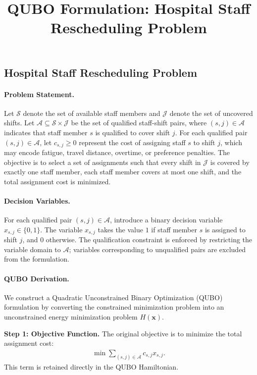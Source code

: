 \documentclass[12pt]{article}
\title{QUBO Formulation: Hospital Staff Rescheduling Problem}
\date{}
\begin{document}
\maketitle

\subsection*{Hospital Staff Rescheduling Problem}

\paragraph{Problem Statement.}
Let $\mathcal{S}$ denote the set of available staff members and $\mathcal{J}$ denote the set of uncovered shifts. Let $\mathcal{A} \subseteq \mathcal{S} \times \mathcal{J}$ be the set of qualified staff-shift pairs, where $(s,j) \in \mathcal{A}$ indicates that staff member $s$ is qualified to cover shift $j$. For each qualified pair $(s,j) \in \mathcal{A}$, let $c_{s,j} \ge 0$ represent the cost of assigning staff $s$ to shift $j$, which may encode fatigue, travel distance, overtime, or preference penalties. The objective is to select a set of assignments such that every shift in $\mathcal{J}$ is covered by exactly one staff member, each staff member covers at most one shift, and the total assignment cost is minimized.

\paragraph{Decision Variables.}
For each qualified pair $(s,j) \in \mathcal{A}$, introduce a binary decision variable $x_{s,j} \in \{0,1\}$. The variable $x_{s,j}$ takes the value $1$ if staff member $s$ is assigned to shift $j$, and $0$ otherwise. The qualification constraint is enforced by restricting the variable domain to $\mathcal{A}$; variables corresponding to unqualified pairs are excluded from the formulation.

\paragraph{QUBO Derivation.}
We construct a Quadratic Unconstrained Binary Optimization (QUBO) formulation by converting the constrained minimization problem into an unconstrained energy minimization problem $H(\mathbf{x})$.

\textbf{Step 1: Objective Function.}
The original objective is to minimize the total assignment cost:
\begin{align}
    \min \sum_{(s,j) \in \mathcal{A}} c_{s,j} x_{s,j}.
\end{align}
This term is retained directly in the QUBO Hamiltonian.
\end{document}
